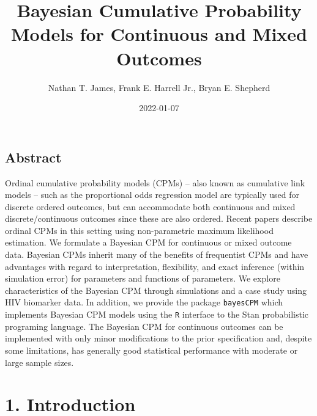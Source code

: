 \documentclass[
]{article}
\title{Bayesian Cumulative Probability Models for Continuous and Mixed Outcomes}
\author{Nathan T. James, Frank E. Harrell Jr., Bryan E. Shepherd}
\date{2022-01-07}
\begin{document}
\maketitle

\hypertarget{abstract}{%
\subsection{Abstract}\label{abstract}}

Ordinal cumulative probability models (CPMs) -- also known as cumulative link models -- such as the proportional odds regression model are typically used for discrete ordered outcomes, but can accommodate both continuous and mixed discrete/continuous outcomes since these are also ordered. Recent papers describe ordinal CPMs in this setting using non-parametric maximum likelihood estimation. We formulate a Bayesian CPM for continuous or mixed outcome data. Bayesian CPMs inherit many of the benefits of frequentist CPMs and have advantages with regard to interpretation, flexibility, and exact inference (within simulation error) for parameters and functions of parameters. We explore characteristics of the Bayesian CPM through simulations and a case study using HIV biomarker data. In addition, we provide the package \texttt{bayesCPM} which implements Bayesian CPM models using the \texttt{R} interface to the Stan probabilistic programing language. The Bayesian CPM for continuous outcomes can be implemented with only minor modifications to the prior specification and, despite some limitations, has generally good statistical performance with moderate or large sample sizes.

\hypertarget{introduction}{%
\section{1. Introduction}\label{introduction}}
\end{document}
